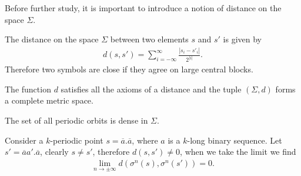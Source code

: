 Before further study, it is important to introduce a notion of distance on the space $\Sigma$.
\begin{definition}
	The distance on the space $\Sigma$ between two elements $s$ and $s'$ is given by
	\begin{align}
		d(s,s') = \sum_{i=-\infty }^{\infty } \frac{|s_i - s'_i |}{2^{|i|}}.
	\end{align}
Therefore two symbols are close if they agree on large central blocks.	
\end{definition}
\begin{remark}[]
	The function $d$ satisfies all the axioms of a distance and the tuple $(\Sigma, d) $ forms a complete metric space. 
\end{remark}

\begin{proposition}
The set of all periodic orbits is dense in $\Sigma$.	
\end{proposition}
\begin{proposition}[]
Consider a $k$-periodic point $s=\overline{a}\bm{.} \overline{a}$, where $a$ is a $k$-long binary sequence. Let $s' = \overline{a}a'\bm{.} \overline{a}$, clearly $s \neq s'$, therefore $d(s,s') \neq 0$, when we take the limit we find
\begin{align}
	\lim_{n\to \pm \infty }	d(\sigma^{n}(s), \sigma^{n}(s')) = 0.
\end{align}
\end{proposition}


